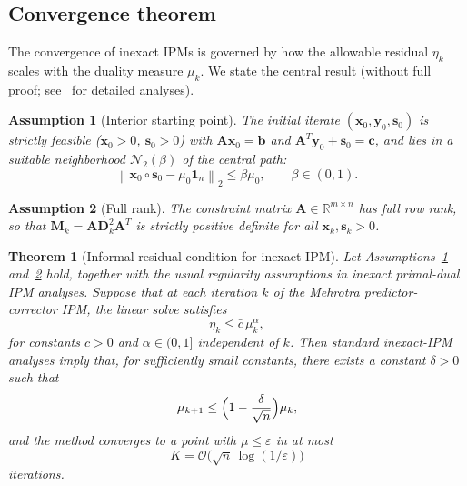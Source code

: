 \documentclass[11pt,twoside]{article}
\newtheorem{theorem}{Theorem}[section]
\newtheorem{assumption}{Assumption}[section]
\newcommand{\R}{\mathbb{R}}
\newcommand{\bA}{\mathbf{A}}
\newcommand{\bb}{\mathbf{b}}
\newcommand{\bc}{\mathbf{c}}
\newcommand{\bx}{\mathbf{x}}
\newcommand{\by}{\mathbf{y}}
\newcommand{\bs}{\mathbf{s}}
\newcommand{\bD}{\mathbf{D}}
\newcommand{\bM}{\mathbf{M}}
\newcommand{\cN}{\mathcal{N}}
\newcommand{\cO}{\mathcal{O}}
\newcommand{\norm}[1]{\left\lVert#1\right\rVert}
\begin{document}
\subsection{Convergence theorem}
\label{sec:conv-theorem}

The convergence of inexact IPMs is governed by how the allowable residual
$\eta_k$ scales with the duality measure $\mu_k$.  We state the central
result (without full proof; see~\cite{Bellavia1998,Monteiro2003} for
detailed analyses).

\begin{assumption}[Interior starting point]
  \label{as:feas}
  The initial iterate $(\bx_0, \by_0, \bs_0)$ is strictly feasible
  ($\bx_0 > 0$, $\bs_0 > 0$) with $\bA\bx_0 = \bb$ and
  $\bA^T\by_0 + \bs_0 = \bc$, and lies in a suitable neighborhood
  $\cN_2(\beta)$ of the central path:
  \begin{equation}
    \norm{\bx_0 \circ \bs_0 - \mu_0\mathbf{1}_n}_2 \le \beta\mu_0,
    \qquad \beta \in (0,1).
    \label{eq:nbhd}
  \end{equation}
\end{assumption}

\begin{assumption}[Full rank]
  \label{as:rank}
  The constraint matrix $\bA \in \R^{m \times n}$ has full row rank, so
  that $\bM_k = \bA\bD_k^2\bA^T$ is strictly positive definite for all
  $\bx_k,\bs_k > 0$.
\end{assumption}

\begin{theorem}[Informal residual condition for inexact IPM]
  \label{th:conv}
  Let Assumptions~\ref{as:feas} and~\ref{as:rank} hold, together with the
  usual regularity assumptions in inexact primal-dual IPM analyses.  Suppose
  that at each iteration $k$ of the Mehrotra predictor-corrector IPM, the
  linear solve satisfies
  \begin{equation}
    \boxed{\eta_k \le \bar{c}\,\mu_k^\alpha},
    \label{eq:eta-condition}
  \end{equation}
  for constants $\bar{c} > 0$ and $\alpha \in (0,1]$ independent of $k$.
  Then standard inexact-IPM analyses imply that, for sufficiently small
  constants, there exists a constant $\delta > 0$ such that
  \begin{equation}
    \mu_{k+1} \le \Bigl(1 - \frac{\delta}{\sqrt{n}}\Bigr)\mu_k,
    \label{eq:mu-linear}
  \end{equation}
  and the method converges to a point with $\mu \le \varepsilon$ in at most
  \begin{equation}
    K = \cO\bigl(\sqrt{n}\,\log(1/\varepsilon)\bigr)
    \label{eq:iter-bound}
  \end{equation}
  iterations.
\end{theorem}
\end{document}
